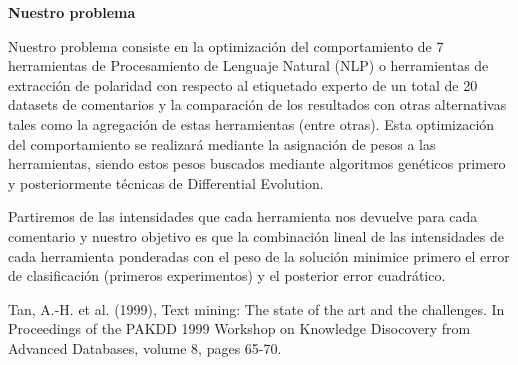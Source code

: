 \documentclass{article}
\begin{document}
\newpage
\textbf{Nuestro problema}

Nuestro problema consiste en la optimización del comportamiento de 7 herramientas de Procesamiento de Lenguaje Natural (NLP) o herramientas de extracción de polaridad con respecto al etiquetado experto de un total de 20 datasets de comentarios y la comparación de los resultados con otras alternativas tales como la agregación de estas herramientas (entre otras). Esta optimización del comportamiento se realizará mediante la asignación de pesos a las herramientas, siendo estos pesos buscados mediante algoritmos genéticos primero y posteriormente técnicas de Differential Evolution.

Partiremos de las intensidades que cada herramienta nos devuelve para cada comentario y nuestro objetivo es que la combinación lineal de las intensidades de cada herramienta ponderadas con el peso de la solución minimice primero el error de clasificación (primeros experimentos) y el posterior error cuadrático.
\begin{thebibliography}{99}
 \hspace{-.22cm} Tan, A.-H. et al. (1999), Text mining: The state of the art and
	the challenges. In Proceedings of the PAKDD 1999 Workshop on Knowledge
	Disocovery from Advanced Databases, volume 8, pages 65-70.
\end{thebibliography}
\end{document}
